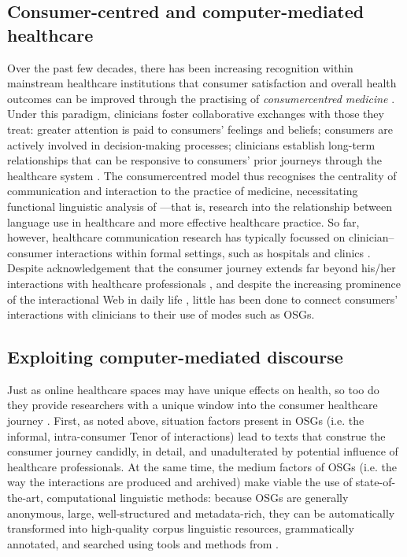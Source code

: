 \subsection{Consumer-centred and computer-mediated healthcare}

Over the past few decades, there has been increasing recognition within mainstream healthcare institutions that consumer satisfaction and overall health outcomes can be improved through the practising of \emph{\gls{consumercentred} medicine} \cite{stewart_effective_1995}. Under this paradigm, clinicians foster collaborative exchanges with those they treat: greater attention is paid to consumers' feelings and beliefs; consumers are actively involved in decision\hyp{}making processes; clinicians establish long\hyp{}term relationships that can be responsive to consumers' prior journeys through the healthcare system \cite{woodward-kron_international_2016}. The \gls{consumercentred} model thus recognises the centrality of communication and interaction to the practice of medicine, necessitating functional linguistic analysis of ---that is, research into the relationship between language use in healthcare and more effective healthcare practice. So far, however, healthcare communication research has typically focussed on clinician--consumer interactions within formal settings, such as hospitals and clinics \cite{slade_communicating_2015}. Despite acknowledgement that the consumer journey extends far beyond his\slash her interactions with healthcare professionals \cite{balka_situating_2010,dickerson_cancer_2011}, and despite the increasing prominence of the interactional Web in daily life \cite{hadlington_cognitive_2015}, little has been done to connect \glspl{consumer}' interactions with clinicians to their use of  \glspl{mode} such as \glspl{OSG}.

\subsection{Exploiting computer-mediated discourse}

Just as online healthcare spaces may have unique effects on health, so too do they provide researchers with a unique window into the consumer healthcare journey \cite{harvey_disclosures_2012}. First, as noted above, situation factors present in \glspl{OSG} (i.e. the informal, intra\hyp{}consumer Tenor of interactions) lead to texts that construe the consumer journey candidly, in detail, and unadulterated by potential influence of healthcare professionals. At the same time, the medium factors of \glspl{OSG} (i.e. the way the interactions are produced and archived) make viable the use of state\hyp{}of\hyp{}the\hyp{}art, computational linguistic methods: because \glspl{OSG} are generally anonymous, large, well\hyp{}structured and metadata\hyp{}rich, they can be automatically transformed into high\hyp{}quality corpus linguistic resources, grammatically annotated, and searched using tools and methods from . 


